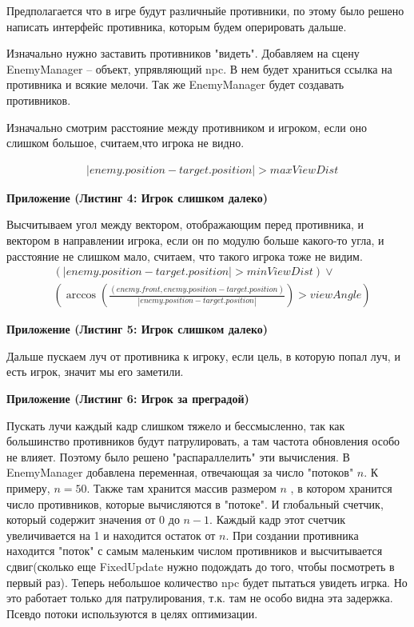 \documentclass[14pt, titlepage,fleqn,a4paper]{extarticle}
\begin{document}
	Предполагается что в игре будут различныйе противники, по этому было решено написать интерфейс противника, которым будем оперировать дальше.
	
    Изначально нужно заставить противников "видеть". Добавляем на сцену EnemyManager -- объект, упрявляющий npc. В нем будет храниться ссылка на противника и  всякие мелочи. Так же EnemyManager будет создавать противников. 
    
    Изначально смотрим расстояние между противником и игроком, если оно слишком большое, считаем,что игрока не видно.
    
    \begin{align*}
        &|enemy.position - target.position| > maxViewDist
    \end{align*}
    
    \textbf{Приложение (Листинг 4: Игрок слишком далеко)}
    
    Высчитываем угол между вектором, отображающим перед противника, и вектором в направлении игрока, если он по модулю больше какого-то угла, и расстояние не слишком мало, считаем, что такого игрока тоже не видим. 
    \begin{align*}
        &\left(|enemy.position - target.position| > minViewDist\right) \lor \\
        & \left(\arccos(\frac{(enemy.front, enemy.position - target.position) }{|enemy.position - target.position|}) > viewAngle\right)
    \end{align*}
    
    \textbf{Приложение (Листинг 5: Игрок слишком далеко)}
    
    Дальше пускаем луч от противника к игроку, если цель, в которую попал луч, и есть игрок, значит мы его заметили.
    
    \textbf{Приложение (Листинг 6: Игрок за преградой)}
    
    \newpage
    
Пускать лучи каждый кадр слишком тяжело и бессмысленно, так как большинство противников будут патрулировать, а там частота обновления особо не влияет. Поэтому было решено "распараллелить" эти вычисления. В EnemyManager добавлена переменная, отвечающая за число "потоков" $n$. К примеру, $n = 50$. Также там хранится массив размером $n$ , в котором хранится число противников, которые вычисляются в "потоке". И глобальный счетчик, который содержит значения от 0 до $n - 1$. Каждый кадр этот счетчик увеличивается на 1 и находится остаток от $n$. При создании противника находится "поток" с самым маленьким числом противников и высчитывается сдвиг(сколько еще FixedUpdate нужно подождать до того, чтобы посмотреть в первый раз). Теперь небольшое количество npc будет пытаться увидеть игрка. Но это работает только для патрулирования, т.к. там не особо видна эта задержка. Псевдо потоки используются в целях оптимизации.
\end{document}
